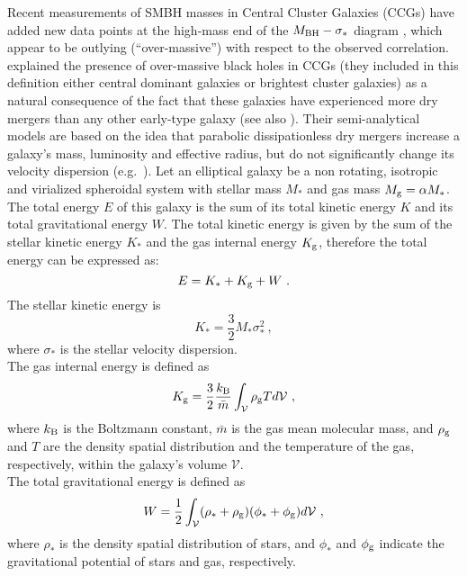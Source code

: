 Recent measurements of SMBH masses in Central Cluster Galaxies (CCGs)
have added new data points at the high-mass end of the 
$M_{\rm BH} - \sigma_*$ diagram \citep{mcconnell2011,mcconnell2012}, 
which appear to be outlying (``over-massive'') with respect to the observed correlation. 
\citet{volontericiotti2013} explained the presence of over-massive black holes in CCGs 
(they included in this definition either central dominant galaxies or brightest cluster galaxies) 
as a natural consequence of the fact that these galaxies have experienced more dry mergers 
than any other early-type galaxy (see also \citealt{kormendyho2013}). 
Their semi-analytical models are based on the idea that parabolic dissipationless dry mergers 
increase a galaxy's mass, luminosity and effective radius, 
but do not significantly change its velocity dispersion (e.g.~\citealt{ciotti2007}). 
Let an elliptical galaxy be a non rotating, isotropic and virialized spheroidal system 
with stellar mass $M_{*}$ and gas mass $M_{\rm g} = \alpha M_{*}$. 
The total energy $E$ of this galaxy is the sum of its total kinetic energy $K$ and its total gravitational energy $W$. 
The total kinetic energy is given by the sum of the stellar kinetic energy $K_*$ and the gas internal energy $K_{\rm g}$, 
therefore the total energy can be expressed as:
\begin{equation}
E = K_* + K_{\rm g} + W \ .
\end{equation}
The stellar kinetic energy is 
\begin{equation}
K_* = \frac{3}{2} M_* \sigma_*^2 \ ,
\end{equation}
where $\sigma_*$ is the stellar velocity dispersion. \\
The gas internal energy is defined as 
\begin{equation}
K_{\rm g} = \frac{3}{2} \frac{k_{\rm B}}{\bar{m} } \int_{\mathcal{V}} \rho_{\rm g} T d\mathcal{V} \ ,
\end{equation}
where $k_{\rm B}$ is the Boltzmann constant, $\bar{m}$ is the gas mean molecular mass, and 
$\rho_{\rm g}$ and $T$ are the density spatial distribution and the temperature of the gas, respectively, 
within the galaxy's volume $\mathcal{V}$. \\
The total gravitational energy is defined as 
\begin{equation}
W = \frac{1}{2} \int_{\mathcal{V}} (\rho_* + \rho_{\rm g}) (\phi_* + \phi_{\rm g}) d\mathcal{V} \ , 
\end{equation}
where $\rho_*$ is the density spatial distribution of stars, 
and $\phi_*$ and $\phi_{\rm g}$ indicate the gravitational potential of stars and gas, respectively. \\
